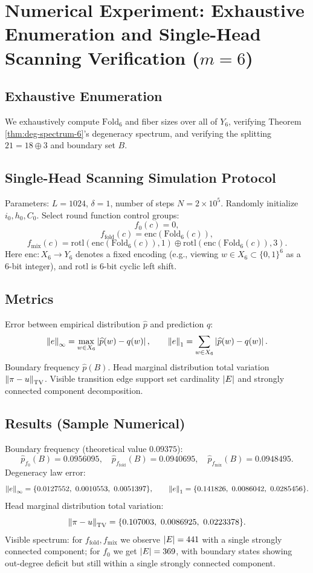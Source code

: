 \section{Numerical Experiment: Exhaustive Enumeration and Single-Head Scanning Verification (\texorpdfstring{$m=6$}{m=6})}

\subsection{Exhaustive Enumeration}

We exhaustively compute $\mathrm{Fold}_6$ and fiber sizes over all of $Y_6$, verifying Theorem \ref{thm:deg-spectrum-6}'s degeneracy spectrum, and verifying the splitting $21=18\oplus 3$ and boundary set $B$.

\subsection{Single-Head Scanning Simulation Protocol}

Parameters: $L=1024$, $\delta=1$, number of steps $N=2\times 10^5$. Randomly initialize $i_0,h_0,C_0$. Select round function control groups:
\[
f_0(c)=0,
\]
\[
f_{\mathrm{fold}}(c)=\mathrm{enc}(\mathrm{Fold}_6(c)),
\]
\[
f_{\mathrm{mix}}(c)=\mathrm{rotl}(\mathrm{enc}(\mathrm{Fold}_6(c)),1)\oplus \mathrm{rotl}(\mathrm{enc}(\mathrm{Fold}_6(c)),3).
\]
Here $\mathrm{enc}:X_6\to Y_6$ denotes a fixed encoding (e.g., viewing $w\in X_6\subset\{0,1\}^6$ as a 6-bit integer), and $\mathrm{rotl}$ is 6-bit cyclic left shift.

\subsection{Metrics}

Error between empirical distribution $\widehat{p}$ and prediction $q$:
\[
\left\lVert e\right\rVert_{\infty}=\max_{w\in X_6}\left\lvert \widehat{p}(w)-q(w)\right\rvert,\qquad
\left\lVert e\right\rVert_{1}=\sum_{w\in X_6}\left\lvert \widehat{p}(w)-q(w)\right\rvert.
\]
Boundary frequency $\widehat{p}(B)$. Head marginal distribution total variation $\left\lVert \pi-u\right\rVert_{\mathrm{TV}}$. Visible transition edge support set cardinality $\left\lvert E\right\rvert$ and strongly connected component decomposition.

\subsection{Results (Sample Numerical)}

Boundary frequency (theoretical value $0.09375$):
\[
\widehat{p}_{f_0}(B)=0.0956095,\quad
\widehat{p}_{f_{\mathrm{fold}}}(B)=0.0940695,\quad
\widehat{p}_{f_{\mathrm{mix}}}(B)=0.0948495.
\]
Degeneracy law error:
\[
\norm{e}_{\infty}=\{0.0127552,\ 0.0010553,\ 0.0051397\},\qquad
\norm{e}_{1}=\{0.141826,\ 0.0086042,\ 0.0285456\}.
\]
Head marginal distribution total variation:
\[
\norm{\pi-u}_{\TV}=\{0.107003,\ 0.0086925,\ 0.0223378\}.
\]
Visible spectrum: for $f_{\mathrm{fold}},f_{\mathrm{mix}}$ we observe $\left\lvert E\right\rvert=441$ with a single strongly connected component; for $f_0$ we get $\left\lvert E\right\rvert=369$, with boundary states showing out-degree deficit but still within a single strongly connected component.
